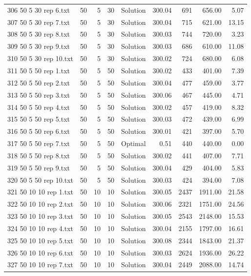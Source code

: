 \begin{longtable}{lrrllrrrr}
306 50 5 30 rep 6.txt & 50 & 5 & 30 & Solution & 300.04 & 691 & 656.00 &  5.07\\
307 50 5 30 rep 7.txt & 50 & 5 & 30 & Solution & 300.04 & 715 & 621.00 & 13.15\\
308 50 5 30 rep 8.txt & 50 & 5 & 30 & Solution & 300.03 & 744 & 720.00 &  3.23\\
309 50 5 30 rep 9.txt & 50 & 5 & 30 & Solution & 300.03 & 686 & 610.00 & 11.08\\
310 50 5 30 rep 10.txt & 50 & 5 & 30 & Solution & 300.02 & 724 & 680.00 &  6.08\\
311 50 5 50 rep 1.txt & 50 & 5 & 50 & Solution & 300.02 & 433 & 401.00 &  7.39\\
312 50 5 50 rep 2.txt & 50 & 5 & 50 & Solution & 300.04 & 477 & 459.00 &  3.77\\
313 50 5 50 rep 3.txt & 50 & 5 & 50 & Solution & 300.06 & 467 & 445.00 &  4.71\\
314 50 5 50 rep 4.txt & 50 & 5 & 50 & Solution & 300.02 & 457 & 419.00 &  8.32\\
315 50 5 50 rep 5.txt & 50 & 5 & 50 & Solution & 300.03 & 472 & 439.00 &  6.99\\
316 50 5 50 rep 6.txt & 50 & 5 & 50 & Solution & 300.01 & 421 & 397.00 &  5.70\\
317 50 5 50 rep 7.txt & 50 & 5 & 50 & Optimal &  0.51 & 440 & 440.00 &  0.00\\
318 50 5 50 rep 8.txt & 50 & 5 & 50 & Solution & 300.02 & 441 & 407.00 &  7.71\\
319 50 5 50 rep 9.txt & 50 & 5 & 50 & Solution & 300.04 & 429 & 404.00 &  5.83\\
320 50 5 50 rep 10.txt & 50 & 5 & 50 & Solution & 300.03 & 424 & 394.00 &  7.08\\
321 50 10 10 rep 1.txt & 50 & 10 & 10 & Solution & 300.05 & 2437 & 1911.00 & 21.58\\
322 50 10 10 rep 2.txt & 50 & 10 & 10 & Solution & 300.06 & 2321 & 1751.00 & 24.56\\
323 50 10 10 rep 3.txt & 50 & 10 & 10 & Solution & 300.05 & 2543 & 2148.00 & 15.53\\
324 50 10 10 rep 4.txt & 50 & 10 & 10 & Solution & 300.04 & 2155 & 1797.00 & 16.61\\
325 50 10 10 rep 5.txt & 50 & 10 & 10 & Solution & 300.08 & 2344 & 1843.00 & 21.37\\
326 50 10 10 rep 6.txt & 50 & 10 & 10 & Solution & 300.03 & 2624 & 1936.00 & 26.22\\
327 50 10 10 rep 7.txt & 50 & 10 & 10 & Solution & 300.04 & 2449 & 2088.00 & 14.74\\

\end{longtable}
